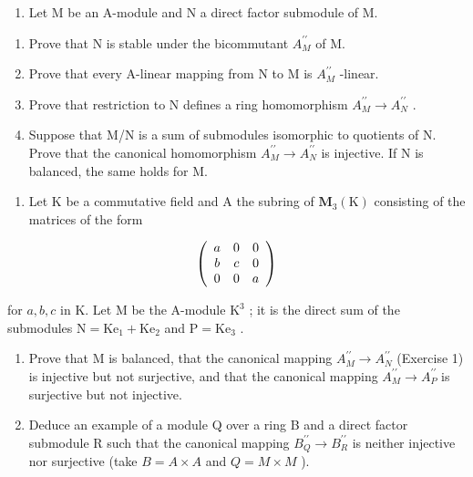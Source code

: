 
\begin{enumerate}
\def\labelenumi{\arabic{enumi})}
\tightlist
\item
  Let M be an A-module and N a direct factor submodule of M.
\end{enumerate}

\begin{enumerate}
\def\labelenumi{\alph{enumi})}
\item
  Prove that N is stable under the bicommutant \(A_{M}^{\prime\prime}\) of M.
\item
  Prove that every A-linear mapping from N to M is \(A_{M}^{\prime\prime}\) -linear.
\item
  Prove that restriction to N defines a ring homomorphism \(A_{M}^{\prime\prime} \to A_{N}^{\prime\prime}\) .
\item
  Suppose that M/N is a sum of submodules isomorphic to quotients of N. Prove that the canonical homomorphism \(A_{M}^{\prime\prime} \rightarrow A_{N}^{\prime\prime}\) is injective. If N is balanced, the same holds for M.
\end{enumerate}

\begin{enumerate}
\def\labelenumi{\arabic{enumi})}
\setcounter{enumi}{1}
\tightlist
\item
  Let K be a commutative field and A the subring of \(\mathbf{M}_{3}(\mathrm{K})\) consisting of the matrices of the form
\end{enumerate}

\[
\left( \begin{array}{c c c} a & 0 & 0 \\ b & c & 0 \\ 0 & 0 & a \end{array} \right)
\]

for \(a, b, c\) in K. Let M be the A-module \(\mathrm{K}^3\) ; it is the direct sum of the submodules \(\mathrm{N} = \mathrm{Ke}_1 + \mathrm{Ke}_2\) and \(\mathrm{P} = \mathrm{Ke}_3\) .

\begin{enumerate}
\def\labelenumi{\alph{enumi})}
\item
  Prove that M is balanced, that the canonical mapping \(A_{M}^{\prime\prime} \rightarrow A_{N}^{\prime\prime}\) (Exercise 1) is injective but not surjective, and that the canonical mapping \(A_{M}^{\prime\prime} \rightarrow A_{P}^{\prime\prime}\) is surjective but not injective.
\item
  Deduce an example of a module Q over a ring B and a direct factor submodule R such that the canonical mapping \(B_{Q}^{\prime\prime} \rightarrow B_{R}^{\prime\prime}\) is neither injective nor surjective (take \(B = A \times A\) and \(Q = M \times M\) ).
\end{enumerate}

